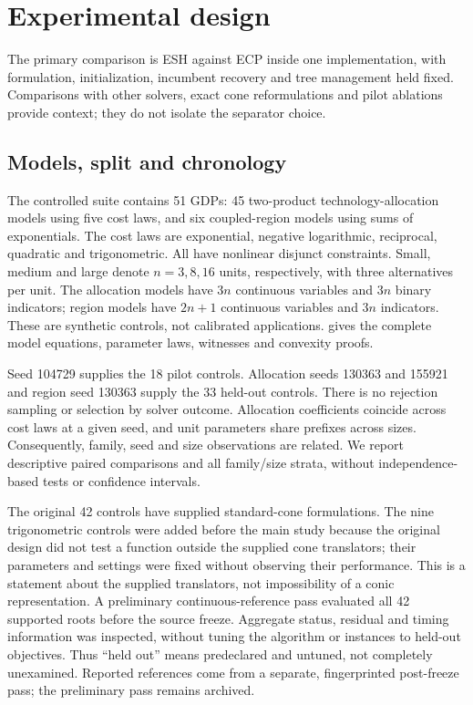 \section{Experimental design}\label{sec:design}
The primary comparison is ESH against ECP inside one implementation, with formulation, initialization, incumbent recovery and tree management held fixed. Comparisons with other solvers, exact cone reformulations and pilot ablations provide context; they do not isolate the separator choice.

\subsection{Models, split and chronology}
The controlled suite contains 51 GDPs: 45 two-product technology-allocation models using five cost laws, and six coupled-region models using sums of exponentials. The cost laws are exponential, negative logarithmic, reciprocal, quadratic and trigonometric. All have nonlinear disjunct constraints. Small, medium and large denote $n=3,8,16$ units, respectively, with three alternatives per unit. The allocation models have $3n$ continuous variables and $3n$ binary indicators; region models have $2n+1$ continuous variables and $3n$ indicators. These are synthetic controls, not calibrated applications.  gives the complete model equations, parameter laws, witnesses and convexity proofs.

Seed 104729 supplies the 18 pilot controls. Allocation seeds 130363 and 155921 and region seed 130363 supply the 33 held-out controls. There is no rejection sampling or selection by solver outcome. Allocation coefficients coincide across cost laws at a given seed, and unit parameters share prefixes across sizes. Consequently, family, seed and size observations are related. We report descriptive paired comparisons and all family/size strata, without independence-based tests or confidence intervals.

The original 42 controls have supplied standard-cone formulations. The nine trigonometric controls were added before the main study because the original design did not test a function outside the supplied cone translators; their parameters and settings were fixed without observing their performance. This is a statement about the supplied translators, not impossibility of a conic representation. A preliminary continuous-reference pass evaluated all 42 supported roots before the source freeze. Aggregate status, residual and timing information was inspected, without tuning the algorithm or instances to held-out objectives. Thus ``held out'' means predeclared and untuned, not completely unexamined. Reported references come from a separate, fingerprinted post-freeze pass; the preliminary pass remains archived.

